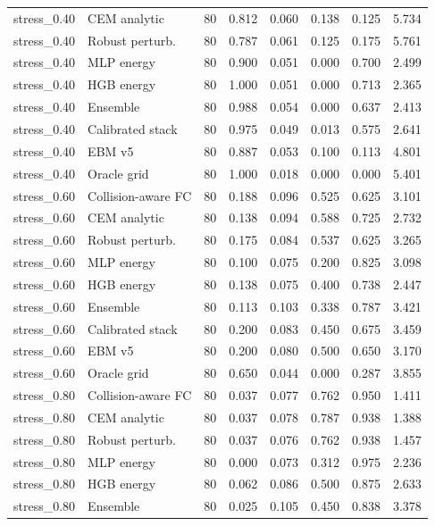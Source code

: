 {\begin{longtable}{llrrrrrr}
stress\_0.40 & CEM analytic & 80 & 0.812 & 0.060 & 0.138 & 0.125 & 5.734 \\
stress\_0.40 & Robust perturb. & 80 & 0.787 & 0.061 & 0.125 & 0.175 & 5.761 \\
stress\_0.40 & MLP energy & 80 & 0.900 & 0.051 & 0.000 & 0.700 & 2.499 \\
stress\_0.40 & HGB energy & 80 & 1.000 & 0.051 & 0.000 & 0.713 & 2.365 \\
stress\_0.40 & Ensemble & 80 & 0.988 & 0.054 & 0.000 & 0.637 & 2.413 \\
stress\_0.40 & Calibrated stack & 80 & 0.975 & 0.049 & 0.013 & 0.575 & 2.641 \\
stress\_0.40 & EBM v5 & 80 & 0.887 & 0.053 & 0.100 & 0.113 & 4.801 \\
stress\_0.40 & Oracle grid & 80 & 1.000 & 0.018 & 0.000 & 0.000 & 5.401 \\
stress\_0.60 & Collision-aware FC & 80 & 0.188 & 0.096 & 0.525 & 0.625 & 3.101 \\
stress\_0.60 & CEM analytic & 80 & 0.138 & 0.094 & 0.588 & 0.725 & 2.732 \\
stress\_0.60 & Robust perturb. & 80 & 0.175 & 0.084 & 0.537 & 0.625 & 3.265 \\
stress\_0.60 & MLP energy & 80 & 0.100 & 0.075 & 0.200 & 0.825 & 3.098 \\
stress\_0.60 & HGB energy & 80 & 0.138 & 0.075 & 0.400 & 0.738 & 2.447 \\
stress\_0.60 & Ensemble & 80 & 0.113 & 0.103 & 0.338 & 0.787 & 3.421 \\
stress\_0.60 & Calibrated stack & 80 & 0.200 & 0.083 & 0.450 & 0.675 & 3.459 \\
stress\_0.60 & EBM v5 & 80 & 0.200 & 0.080 & 0.500 & 0.650 & 3.170 \\
stress\_0.60 & Oracle grid & 80 & 0.650 & 0.044 & 0.000 & 0.287 & 3.855 \\
stress\_0.80 & Collision-aware FC & 80 & 0.037 & 0.077 & 0.762 & 0.950 & 1.411 \\
stress\_0.80 & CEM analytic & 80 & 0.037 & 0.078 & 0.787 & 0.938 & 1.388 \\
stress\_0.80 & Robust perturb. & 80 & 0.037 & 0.076 & 0.762 & 0.938 & 1.457 \\
stress\_0.80 & MLP energy & 80 & 0.000 & 0.073 & 0.312 & 0.975 & 2.236 \\
stress\_0.80 & HGB energy & 80 & 0.062 & 0.086 & 0.500 & 0.875 & 2.633 \\
stress\_0.80 & Ensemble & 80 & 0.025 & 0.105 & 0.450 & 0.838 & 3.378 \\

\end{longtable}}
